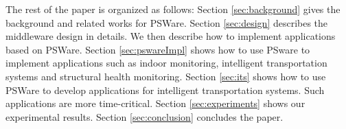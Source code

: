 The rest of the paper is organized as follows: Section \ref{sec:background} gives the background and related works for PSWare. Section \ref{sec:design} describes the middleware design in details. We then describe how to implement applications based on PSWare. Section \ref{sec:pswareImpl} shows how to use PSware to implement applications such as indoor monitoring, intelligent transportation systems and structural health monitoring. Section \ref{sec:its} shows how to use PSWare to develop applications for intelligent transportation systems. Such applications are more time-critical. Section \ref{sec:experiments} shows our experimental results. Section \ref{sec:conclusion} concludes the paper.
